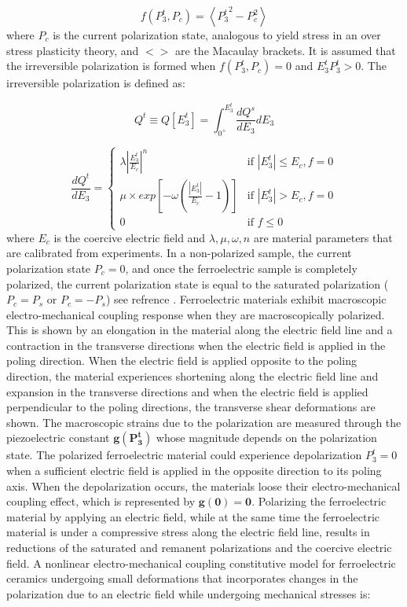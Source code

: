 \begin{equation}
\label{EQN:SurfacePol}
f(P_3^t,P_c)=\left< {P_3^t}^2-P_c^2 \right> 
\end{equation}
where $P_c$ is the current polarization state,
 analogous to yield stress in an over stress plasticity theory,
  and $<>$ are the Macaulay brackets.
It is assumed that the irreversible polarization is formed when $f(P_3^t,P_c)=0$ and $E_3^t P_3^t>0$. 
The irreversible polarization is defined as:

\begin{equation}
Q^t\equiv Q[E_3^t]= \int_{0^+}^{E_3^t}\frac{d Q^s}{d E_3}{dE_3}
\label{EQN:IrrevePol}
\end{equation}

\begin{equation}
\frac{d Q^t}{d E_3}=
\begin{cases}

\lambda|\frac{E_3^t}{E_c}|^n & \text{if } |E_3^t|\leq E_c, f=0 \\
\mu \times exp[-\omega(\frac{|E_3^t|}{E_c}-1)] & \text{if }|E_3^t|> E_c, f=0 \\ 0
& \text{if } f \leq 0 

\end{cases}
\label{EQN:TimeDepIrrevePol}  
\end{equation}
where $E_c$ is the coercive electric field and $\lambda,\mu,\omega,n$ are material parameters that are calibrated from experiments. 
In a non-polarized sample, the current polarization state $P_c=0$,
 and once the ferroelectric sample is completely polarized, 
the current polarization state is equal to the saturated polarization ($P_c=P_s$ or $P_c=-P_s$) see refrence \cite{Muliana2011}.
Ferroelectric materials exhibit macroscopic electro-mechanical coupling response when they are macroscopically polarized. 
This is shown by an elongation in the material along the electric field line and a contraction in the transverse directions when the electric field is applied in the poling direction. 
When the electric field is applied opposite to the poling direction,
 the material experiences shortening along the electric field line and expansion in the transverse directions and when the electric field is applied perpendicular to the poling directions,
  the transverse shear deformations are shown. 
The macroscopic strains due to the polarization are measured through the piezoelectric constant $\mathbf{g(P^t_3)}$ whose magnitude depends on the polarization state.
The polarized ferroelectric material could experience depolarization $P^t_3=0$ when a sufficient electric field is applied in the opposite direction to its poling axis.
When the depolarization occurs, the materials loose their electro-mechanical coupling effect, which is represented by $\mathbf{g(0)=0}$. 
Polarizing the ferroelectric material by applying an electric field,
 while at the same time the ferroelectric material is under a compressive stress along the electric field line, 
 results in reductions of the saturated and remanent polarizations and the coercive electric field. 
A nonlinear electro-mechanical coupling constitutive model for ferroelectric ceramics undergoing small deformations that
 incorporates changes in the polarization due to an electric field while
 undergoing mechanical stresses is:
 
